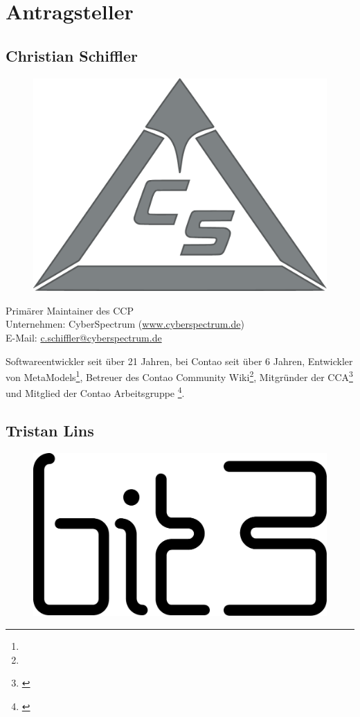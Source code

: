 \documentclass[
paper=a4,
draft=false,%
fontsize=10pt%
]{scrartcl}
\begin{document}
\newpage

%
%

\section{Antragsteller}
\label{sec:proposer}

\subsection*{Christian  Schiffler}

\begin{figure}
  \vspace{-50pt}
  \hfill
  \includegraphics[width=.2\textwidth]{bilder/cyberspectrum}
\end{figure}

Primärer Maintainer des CCP \\
Unternehmen: CyberSpectrum (\href{https://www.cyberspectrum.de}{www.cyberspectrum.de}) \\
E-Mail: \href{mailto:c.schiffler@cyberspectrum.de}{c.schiffler@cyberspectrum.de}

Softwareentwickler seit über 21 Jahren, bei Contao seit über 6 Jahren, Entwickler von MetaModels\footnote{}, Betreuer des Contao Community Wiki\footnote{}, Mitgründer der CCA\footnote{\label{fn:cca}} und Mitglied der Contao Arbeitsgruppe \footnote{\label{fn:contao-workgroup-core}}.

\subsection*{Tristan  Lins}

\begin{figure}
  \vspace{-40pt}
  \hfill
  \includegraphics[width=.2\textwidth]{bilder/bit3}
\end{figure}
\end{document}
